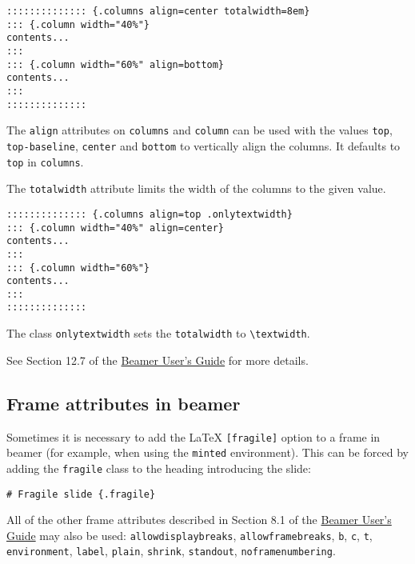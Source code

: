 \documentclass[]{article}
\begin{document}
\begin{verbatim}
:::::::::::::: {.columns align=center totalwidth=8em}
::: {.column width="40%"}
contents...
:::
::: {.column width="60%" align=bottom}
contents...
:::
::::::::::::::
\end{verbatim}

The \texttt{align} attributes on \texttt{columns} and \texttt{column}
can be used with the values \texttt{top}, \texttt{top-baseline},
\texttt{center} and \texttt{bottom} to vertically align the columns. It
defaults to \texttt{top} in \texttt{columns}.

The \texttt{totalwidth} attribute limits the width of the columns to the
given value.

\begin{verbatim}
:::::::::::::: {.columns align=top .onlytextwidth}
::: {.column width="40%" align=center}
contents...
:::
::: {.column width="60%"}
contents...
:::
::::::::::::::
\end{verbatim}

The class \texttt{onlytextwidth} sets the \texttt{totalwidth} to
\texttt{\textbackslash{}textwidth}.

See Section 12.7 of the
\href{http://mirrors.ctan.org/macros/latex/contrib/beamer/doc/beameruserguide.pdf}{Beamer
User's Guide} for more details.

\hypertarget{frame-attributes-in-beamer}{%
\subsection{Frame attributes in
beamer}\label{frame-attributes-in-beamer}}

Sometimes it is necessary to add the LaTeX \texttt{{[}fragile{]}} option
to a frame in beamer (for example, when using the \texttt{minted}
environment). This can be forced by adding the \texttt{fragile} class to
the heading introducing the slide:

\begin{verbatim}
# Fragile slide {.fragile}
\end{verbatim}

All of the other frame attributes described in Section 8.1 of the
\href{http://mirrors.ctan.org/macros/latex/contrib/beamer/doc/beameruserguide.pdf}{Beamer
User's Guide} may also be used: \texttt{allowdisplaybreaks},
\texttt{allowframebreaks}, \texttt{b}, \texttt{c}, \texttt{t},
\texttt{environment}, \texttt{label}, \texttt{plain}, \texttt{shrink},
\texttt{standout}, \texttt{noframenumbering}.
\end{document}
